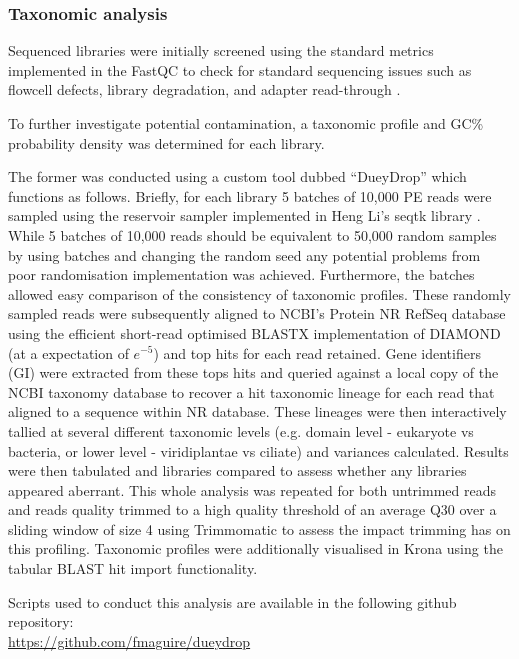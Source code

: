 \subsubsection{Taxonomic analysis}
Sequenced libraries were initially screened using the standard
metrics implemented in the FastQC to check for standard sequencing issues
such as flowcell defects, library degradation, and adapter read-through \citep{fastqc2015}.

To further investigate potential contamination, a taxonomic
profile and GC\% probability density was determined for each library.

The former was conducted using a custom tool dubbed ``DueyDrop'' which functions as follows.
Briefly, for each library 5 batches of 10,000 PE reads were sampled 
using the reservoir sampler \citep{Vitter1985} implemented in Heng Li's seqtk library \citep{SeqtkGitHub}. While 5 batches of 10,000 reads should be equivalent to 50,000 random samples by using batches and changing the random seed any potential problems from poor randomisation implementation was achieved.  Furthermore, the batches allowed easy comparison of the consistency of taxonomic profiles.
These randomly sampled reads were subsequently aligned to NCBI's Protein NR RefSeq database \citep{Pruitt2007}
using the efficient short-read optimised BLASTX implementation of DIAMOND \citep{Buchfink2015} (at a expectation
    of \(e^{-5}\)) and top hits for each read retained.  Gene identifiers (GI) were extracted from these tops hits and queried against a
local copy of the NCBI taxonomy database \citep{Federhen2012} to recover a hit taxonomic lineage for each
read that aligned to a sequence within NR database. These lineages were then interactively tallied 
at several different taxonomic levels (e.g. domain level - eukaryote vs bacteria, or lower level - viridiplantae vs ciliate) and variances
calculated.  Results were then tabulated and libraries compared to assess whether any libraries appeared
aberrant.  This whole analysis was repeated for both untrimmed reads and reads quality trimmed
to a high quality threshold of an average Q30 over a sliding window of size 4 using
Trimmomatic \citep{Bolger2014a} to assess the impact trimming has on this profiling.
Taxonomic profiles were additionally visualised in Krona \citep{Ondov2011} using
the tabular BLAST hit import functionality.

Scripts used to conduct this analysis are available in the following github repository:\\
\url{https://github.com/fmaguire/dueydrop}

